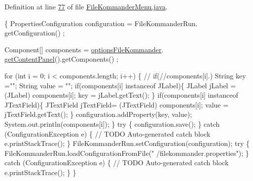 Definition at line \hyperlink{L77}{77} of file \hyperlink{}{File\-Kommander\-Menu.\-java}.


\begin{DoxyCode}
                                    \{
        PropertiesConfiguration configuration = FileKommanderRun.
      getConfiguration() ;
        
        Component[] components = \hyperlink{classcom_1_1poly_1_1nlp_1_1filekommander_1_1views_1_1_file_kommander_menu_a003b2d89fc465db1befab3410121166d}{optionsFileKommander}.
      \hyperlink{classcom_1_1poly_1_1nlp_1_1filekommander_1_1views_1_1_options_file_kommander_a9620544d34bd81849c5883f30a84bab8}{getContentPanel}().getComponents() ;
        
        \textcolor{keywordflow}{for} (\textcolor{keywordtype}{int} i = 0; i < components.length; i++) \{
        \textcolor{comment}{//  if(//components[i].)}
            String key =\textcolor{stringliteral}{""};
            String value = \textcolor{stringliteral}{""};
            \textcolor{keywordflow}{if}(components[i] instanceof JLabel)\{
                JLabel jLabel = (JLabel) components[i];
                key = jLabel.getText();
            \}
            \textcolor{keywordflow}{if}(components[i] instanceof JTextField)\{
                JTextField jTextField= (JTextField) components[i];
                value = jTextField.getText();
            \}
            configuration.addProperty(key, value);
            System.out.println(components[i]);
        \}
        \textcolor{keywordflow}{try} \{
            configuration.save();
        \} \textcolor{keywordflow}{catch} (ConfigurationException e) \{
            \textcolor{comment}{// TODO Auto-generated catch block}
            e.printStackTrace();
        \}
        FileKommanderRun.setConfiguration(configuration);
        \textcolor{keywordflow}{try} \{
            FileKommanderRun.loadConfigurationFromFile(\textcolor{stringliteral}{"
      /filekommander.properties"});
        \} \textcolor{keywordflow}{catch} (ConfigurationException e) \{
            \textcolor{comment}{// TODO Auto-generated catch block}
            e.printStackTrace();
        \}
    \}
\end{DoxyCode}
